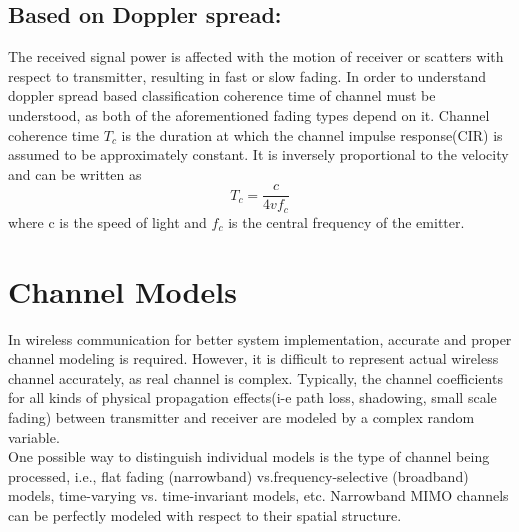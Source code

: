 \subsection{Based on Doppler spread:}
The received signal power is affected with the motion of receiver or scatters with respect to transmitter, resulting in fast or slow fading.  In order to understand doppler spread based classification coherence time of channel must be understood, as both of the aforementioned fading types depend on it. Channel coherence time $T_c$ is the duration at which the channel impulse response(CIR) is assumed to be approximately constant. It is inversely proportional to the velocity and can be written as
\begin{equation}
    T_c=\frac{c}{4vf_c}
\end{equation}
where c is the speed of light and $f_c$ is the central frequency of the emitter. 
\section{Channel Models}
In wireless communication for better system implementation, accurate and proper channel modeling is required. However, it is difficult to represent actual wireless channel accurately, as real channel is complex. Typically, the channel coefficients for all kinds of physical propagation effects(i-e path loss, shadowing, small scale fading) between transmitter and receiver are modeled by a complex random variable.\\
One possible way to distinguish individual models is the type of channel being processed,  i.e., flat fading (narrowband) vs.frequency-selective (broadband) models, time-varying vs. time-invariant models, etc. Narrowband MIMO channels can be perfectly modeled with respect to their spatial structure.

